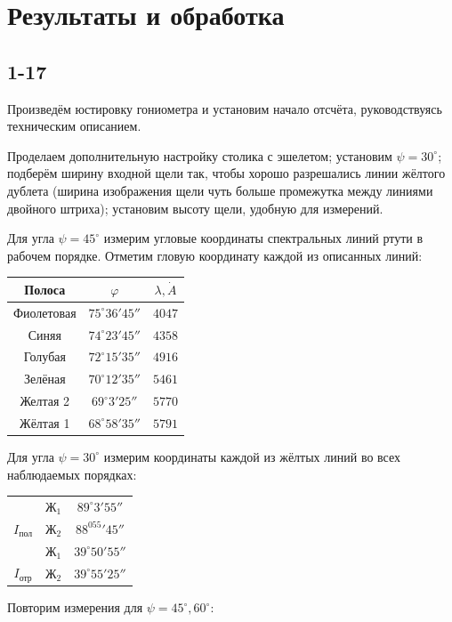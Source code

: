 \documentclass[a4paper,12pt]{article}
\begin{document}
\section*{Результаты и обработка}
\subsection{1-17}
Произведём юстировку гониометра и установим начало отсчёта, руководствуясь техническим описанием.

Проделаем дополнительную настройку столика с эшелетом; установим $\psi = 30^\circ$; подберём ширину входной щели так, чтобы хорошо разрешались линии жёлтого дублета (ширина изображения щели чуть больше промежутка между линиями двойного штриха); установим высоту щели, удобную для измерений.

Для угла $\psi = 45^\circ$ измерим угловые координаты спектральных линий ртути в рабочем порядке. Отметим гловую координату каждой из описанных линий:\\
\begin{center}
\begin{tabular}{|c|c|c|}  \hline
Полоса         & $\varphi          $ & $\lambda, \dot A$ \\\hline
Фиолетовая     & $75^\circ 36' 45''$ & $4047$ \\\hline
Синяя          & $74^\circ 23' 45''$ & $4358$ \\\hline
Голубая        & $72^\circ 15' 35''$ & $4916$ \\\hline
Зелёная        & $70^\circ 12' 35''$ & $5461$ \\\hline
Желтая 2       & $69^\circ 3 ' 25''$ & $5770$ \\\hline
Жёлтая 1       & $68^\circ 58' 35''$ & $5791$ \\\hline
\end{tabular}
\end{center}

Для угла $\psi = 30^\circ$ измерим координаты каждой из жёлтых линий во всех наблюдаемых порядках:

\begin{center}
\begin{tabular}{|c|c|c|} \hline
& $Ж_1$ & $89^\circ3'55''$ \\
\cline{2-3}
$I_{пол}$
& $Ж_2$ & $88^055'45''$ \\\hline
& $Ж_1$ & $39^\circ50'55''$ \\
\cline{2-3}
$I_{отр}$
& $Ж_2$ & $39^\circ55'25''$ \\\hline
\end{tabular}
\end{center}
Повторим измерения для $\psi = 45^\circ, 60^\circ$:
\end{document}
